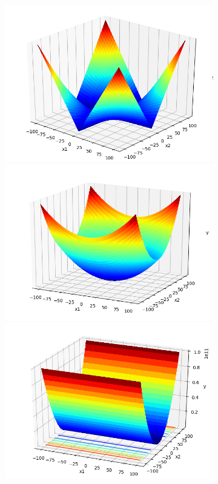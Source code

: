 \documentclass[a4paper,13pt,2p]{report}
\begin{document}
\begin{figure}[!ht] 
   \centering
   \begin{subfigure}{0.24\textwidth}
  	 \includegraphics[width=1\linewidth]{png/functions/islo_uni_F4}
  	 \includegraphics[width=1\linewidth]{png/functions/islo_uni_F5}
  	 \includegraphics[width=1\linewidth]{png/functions/islo_uni_F7}

\end{subfigure}
\end{figure}
\end{document}
